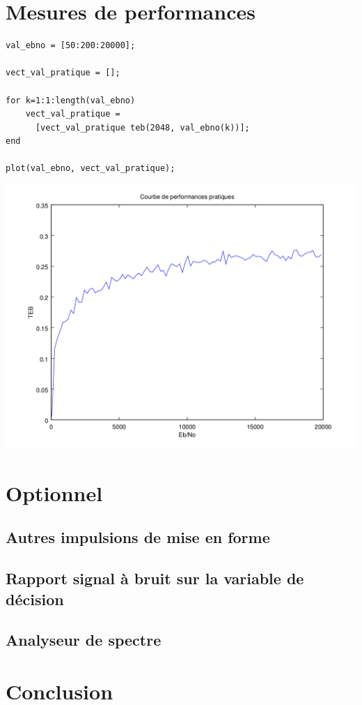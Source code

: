\documentclass{acm_proc_article-sp}
\begin{document}
\section{Mesures de performances}

\begin{lstlisting}
val_ebno = [50:200:20000];

vect_val_pratique = [];

for k=1:1:length(val_ebno)
    vect_val_pratique = 
      [vect_val_pratique teb(2048, val_ebno(k))];
end

plot(val_ebno, vect_val_pratique);
\end{lstlisting}

\begin{center}
\includegraphics[scale=0.45]{performance_prat_8.png}
\end{center}

\section{Optionnel}
\subsection{Autres impulsions de mise en forme}
\subsection{Rapport signal à bruit sur la variable de décision}
\subsection{Analyseur de spectre}


\section{Conclusion}


\nocite{*}

\balancecolumns
\end{document}
